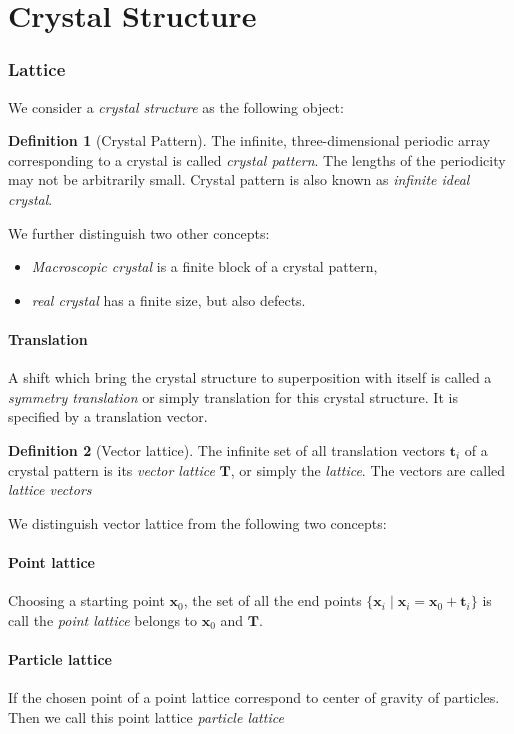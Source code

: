 \documentclass{amsart}
\newcommand{\bfx}{\mathbf{x}}
\newcommand{\bft}{\mathbf{t}}
\theoremstyle{remark}
\theoremstyle{remark}
\theoremstyle{definition}
\newtheorem*{definition}{Definition}
\begin{document}
\part{Crystal Structure}
\section*{Lattice}
We consider a \emph{crystal structure} as the following object:
\begin{definition}
    [Crystal Pattern]
    The infinite, three-dimensional periodic array corresponding to a crystal is called \emph{crystal pattern}.
    The lengths of the periodicity may not be arbitrarily small. Crystal pattern is also known 
    as \emph{infinite ideal crystal}.
\end{definition}
We further distinguish two other concepts:
\begin{itemize}
    \item \emph{Macroscopic crystal} is a finite block of a crystal pattern,
    \item \emph{real crystal} has a finite size, but also defects.
\end{itemize}

\subsection*{Translation}
A shift which bring the crystal structure to superposition with itself is called 
a \emph{symmetry translation} or simply translation for this crystal structure. 
It is specified by a translation vector.

\begin{definition}
    [Vector lattice]
    The infinite set of all translation vectors $\bft_i$ of a crystal pattern is its \emph{vector lattice} $\mathbf{T}$, 
    or simply the \emph{lattice}. 
    The vectors are called \emph{lattice vectors}
\end{definition}
We distinguish vector lattice from the following two concepts:

\subsection*{Point lattice}
Choosing a starting point $\bfx_0$, the set of all the end points $\{\bfx_i\mid\bfx_i = \bfx_0 + \bft_i\}$
is call the \emph{point lattice} belongs to $\bfx_0$ and $\mathbf{T}$.
\subsection*{Particle lattice}
If the chosen point of a point lattice correspond to center of gravity of particles. Then we call this point lattice \emph{particle lattice}
\end{document}
